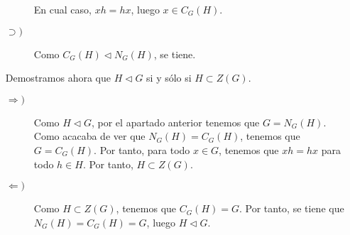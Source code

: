 \begin{ejercicio}
\begin{enumerate}
\begin{description}
            En cual caso, $xh=hx$, luego $x\in C_G(H)$.

            \item[$\supset)$] Como $C_G(H)\lhd N_G(H)$, se tiene.
        \end{description}

        Demostramos ahora que $H\lhd G$ si y sólo si $H\subset Z(G)$.
        \begin{description}
            \item[$\Longrightarrow)$] Como $H\lhd G$, por el apartado anterior tenemos que $G=N_G(H)$. Como acacaba de ver que $N_G(H)=C_G(H)$, tenemos que $G=C_G(H)$. Por tanto, para todo $x\in G$, tenemos que $xh=hx$ para todo $h\in H$. Por tanto, $H\subset Z(G)$.
            
            \item[$\Longleftarrow)$] Como $H\subset Z(G)$, tenemos que $C_G(H)=G$. Por tanto, se tiene que $N_G(H)=C_G(H)=G$, luego $H\lhd G$.
        \end{description}
    \end{enumerate}
\end{ejercicio}

